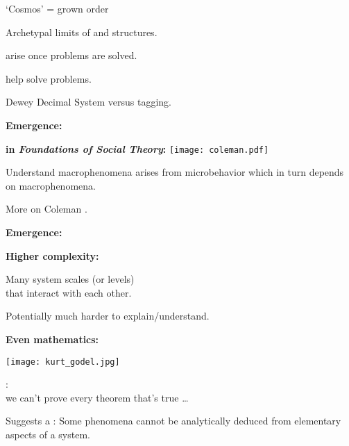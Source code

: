 \begin{frame}[plain]
\begin{frame}[plain]
      `Cosmos' = grown order
    
      Archetypal limits of  and  structures.
    
       arise once problems are solved.\cite{dodds2003c}
    
       help solve problems.
    
      Dewey Decimal System versus tagging.
    
  



  \textbf{Emergence:}

  \textbf{
      \smallskip
      in \textit{Foundations of Social Theory}:}
    \texttt{[image: coleman.pdf]}
  

  \bigskip

  
  
   
    Understand macrophenomena arises from microbehavior
    which in turn depends on macrophenomena.\cite{coleman1994a}
  
    More on Coleman 
    .
  
  


  \textbf{Emergence:}

  \textbf{Higher complexity:}
    
     
      Many system scales (or levels) \\ 
      that
      interact with each other.
    
      Potentially much harder to explain/understand.
    
  

  \textbf{Even mathematics:\cite{foote2007a}}
          
      
      \texttt{[image: kurt\_godel.jpg]}
      
      :\\
      we can't prove every theorem that's true \ldots
      

  
    
     
      Suggests a :
      {
        Some phenomena cannot be analytically deduced
        from elementary aspects of a system.
      }
    

\end{frame}
\end{frame}
